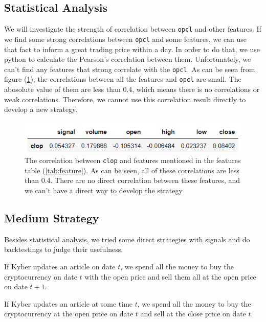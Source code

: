 \documentclass[twoside]{report}
\newcommand{\code}{\texttt}
\begin{document}
\begin{spacing}{1}
\subsection{Statistical Analysis}
We will investigate the strength of correlation between \code{opcl} and other features. If we find some strong correlations between \code{opcl} and some features, we can use that fact to inform a great trading price within a day. In order to do that, we use python to calculate the Pearson's correlation between them.   Unfortunately, we can't find any features that strong correlate with the \code{opcl}. As can be seen from figure (\ref{medium stats}), the correlations between all the features and \code{opcl} are small. The abosolute value of them are less than 0.4, which means there is no correlations or weak correlations. Therefore, we cannot use this correlation result directly to develop a new strategy.

\begin{figure}[!htbp]
    \centering
    \includegraphics{Images/Medium stats.png}
    \caption{The correlation between \code{clop} and features mentioned in the features table (\ref{tab:feature}). As can be seen, all of these correlations are less than 0.4. There are no direct correlation between these features, and we can't have a direct way to develop the strategy}
    \label{medium stats}
\end{figure}


\subsection{Medium Strategy }
Besides statistical analysis, we tried some direct strategies with signals and do backtestings to judge their usefulness. 



\begin{strategy}
If Kyber updates an article on date $t$, we spend all the money to buy the cryptocurrency on date $t$ with the open price and sell them all at the open price on date $t+1$.
\end{strategy}\label{strat:Kyber1}

\begin{strategy}
If Kyber updates an article at some time $t$, we spend all the money to buy the cryptocurrency at the open price on date $t$ and sell at the close price on date $t$.
\end{strategy}\label{strat:Kyber2} 


\end{spacing}
\end{document}
